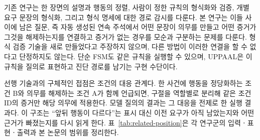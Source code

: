 \begin{revision}
기존 연구는 한 장면의 설명과 행동의 정렬, 사람이 정한 규칙의 형식화와 검증, 개별 요구 문장의 형식화, 그리고 형식 명세에 대한 경로 감시를 다룬다. 본 연구는 이들 사이에 남은 질문, 즉 자동 생성된 연속 주석에서 어떤 문장이 의무를 만들고 어떤 증거가 그것을 해제하는지를 연결하고 증거가 없는 경우를 모순과 구분하는 문제를 다룬다. 형식 검증 기술을 새로 만들었다고 주장하지 않으며, 다른 방법이 이러한 연결을 할 수 없다고 단정하지도 않는다. 단순 FSM도 같은 규칙을 실행할 수 있으며, UPPAAL은 이 규칙을 질의로 표현하고 진단 경로를 남기는 구현 수단이다.

선행 기술과의 구체적인 접점은 조건의 대응 관계다. 한 사건에 행동을 정당화하는 조건 B와 의무를 해제하는 조건 A가 함께 언급되면, 구절을 역할별로 분리해 같은 조건 ID의 증거만 해당 의무에 적용한다. 모델 질의의 결과는 그 대응을 전제로 한 실행 결과다. 이 구조는 ``앞뒤 행동이 다르다''는 표시 대신 이전 요구가 아직 남았는지와 어떤 근거가 빠졌는지를 다시 읽게 한다. 표~\ref{tab:related-position}은 각 연구군의 입력ㆍ표현ㆍ출력과 본 논문의 범위를 정리한다.


\end{revision}
